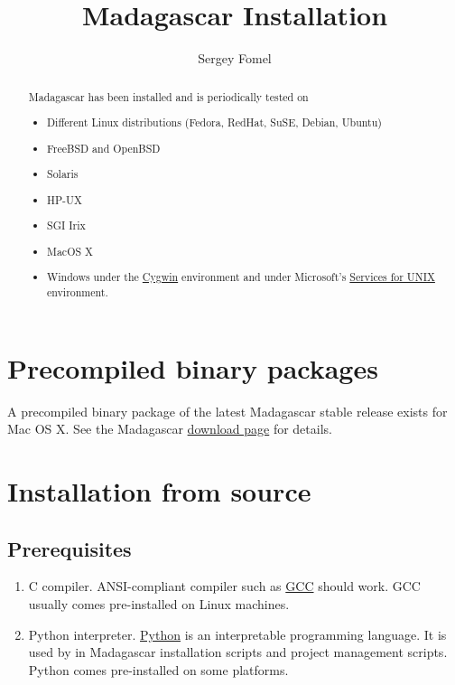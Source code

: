 \title{Madagascar Installation}
\author{Sergey Fomel}

%

\maketitle

\begin{abstract}
Madagascar has been installed and is periodically tested on
\begin{itemize}
\item Different Linux distributions (Fedora, RedHat, SuSE, Debian, Ubuntu)
\item FreeBSD and OpenBSD
\item Solaris
\item HP-UX
\item SGI Irix
\item MacOS X
\item Windows under the \href{http://www.cygwin.com/}{Cygwin} environment and 
under Microsoft's \href{http://www.microsoft.com/technet/interopmigration/unix/sfu/default.mspx}{Services for UNIX} environment.
\end{itemize}
\end{abstract}

\section{Precompiled binary packages}

A precompiled binary package of the latest Madagascar stable release
exists for Mac OS X. See the Madagascar
\href{http://rsf.sourceforge.net/Download}{download page} for details.

\section{Installation from source}

\subsection{Prerequisites}

\begin{enumerate}
\item C compiler. ANSI-compliant compiler such as
  \href{http://gcc.gnu.org/}{GCC} should work. GCC usually comes pre-installed
  on Linux machines.
\item Python interpreter. \href{http://www.python.org/}{Python} is an
  interpretable programming language. It is used by in Madagascar
  installation scripts and project management scripts.  Python comes
  pre-installed on some platforms.
\end{enumerate}

